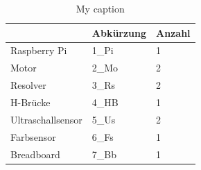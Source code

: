 \documentclass[12pt,a4paper,oneside]{article}
\begin{document}
\begin{spacing}{1.15}
\begin{table}[h]
	\centering
	\caption{My caption}
	\label{my-label}
	\begin{tabular}{lll}
		\hline
		\rowcolor[HTML]{9B9B9B} 
		\multicolumn{1}{|l|}{\cellcolor[HTML]{9B9B9B}\textbf{Komponente}} & \multicolumn{1}{l|}{\cellcolor[HTML]{9B9B9B}\textbf{Abkürzung}} & \multicolumn{1}{l|}{\cellcolor[HTML]{9B9B9B}\textbf{Anzahl}} \\  \hline
		Raspberry Pi                                                      & 1\_Pi                                                           & 1                                                                                                                                                                                \\
		Motor                                                             & 2\_Mo                                                           & 2                                                                                                                                             \\
		Resolver                                                          & 3\_Rs                                                           & 2                                                                                                                                              \\
		H-Brücke                                                          & 4\_HB                                                           & 1                                                                                                                                                   \\
		Ultraschallsensor                                                 & 5\_Us                                                           & 2                                                                                                                                        \\
		Farbsensor                                                        & 6\_Fs                                                           & 1                                                                                                                                            \\
		Breadboard                                                        & 7\_Bb                                                           & 1                                                                                                                         \\

\end{tabular}
\end{table}
\end{spacing}
\end{document}
